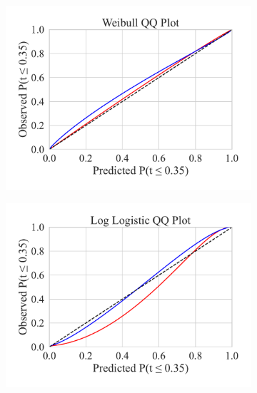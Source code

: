 \documentclass[conference]{IEEEtran}
\begin{document}
\begin{figure}[h!]
    \centering
    \captionsetup[subfigure]{skip=0pt} %
    \begin{subfigure}[b]{.3\linewidth}
        \centering
        \includegraphics[width=\linewidth,clip]{plots/combined/weibull_qq.pdf}
        \caption{}
    \end{subfigure}
    \begin{subfigure}[b]{.3\linewidth}
        \centering
        \includegraphics[width=\linewidth,clip]{plots/combined/log_logistic_qq.pdf}
        \caption{ }
    \end{subfigure}
    \begin{subfigure}[b]{.3\linewidth}
        \centering

\end{subfigure}
\end{figure}
\end{document}
